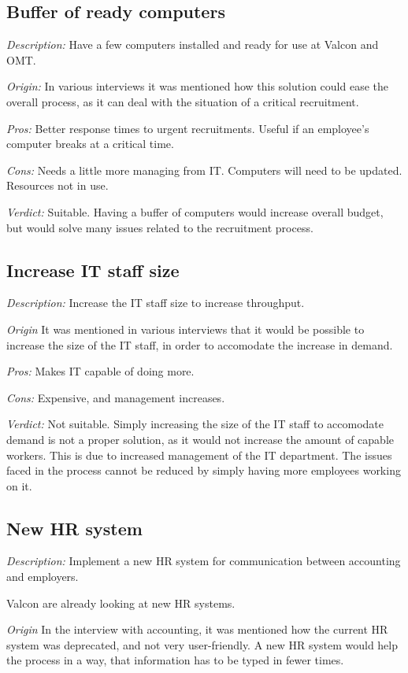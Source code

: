 \subsection{Buffer of ready computers}
\emph{Description:} Have a few computers installed and ready for use at Valcon and OMT.

\emph{Origin:}
In various interviews it was mentioned how this solution could ease the overall process, as it can deal with the situation of a critical recruitment.

\noindent \emph{Pros:} Better response times to urgent recruitments. Useful if an employee's computer breaks at a critical time.

\noindent \emph{Cons:} Needs a little more managing from IT. Computers will need to be updated. Resources not in use.

\emph{Verdict:}
Suitable. Having a buffer of computers would increase overall budget, but would solve many issues related to the recruitment process.

\subsection{Increase IT staff size}
\emph{Description:} Increase the IT staff size to increase throughput.

\emph{Origin}
It was mentioned in various interviews that it would be possible to increase the size of the IT staff, in order to accomodate the increase in demand.

\noindent \emph{Pros:} Makes IT capable of doing more.

\noindent \emph{Cons:} Expensive, and management increases.

\emph{Verdict:}
Not suitable. Simply increasing the size of the IT staff to accomodate demand is not a proper solution, as it would not increase the amount of capable workers. This is due to increased management of the IT department. The issues faced in the process cannot be reduced by simply having more employees working on it.

\subsection{New HR system}
\emph{Description:} Implement a new HR system for communication between accounting and employers.

Valcon are already looking at new HR systems.

\emph{Origin}
In the interview with accounting, it was mentioned how the current HR system was deprecated, and not very user-friendly.
A new HR system would help the process in a way, that information has to be typed in fewer times.


